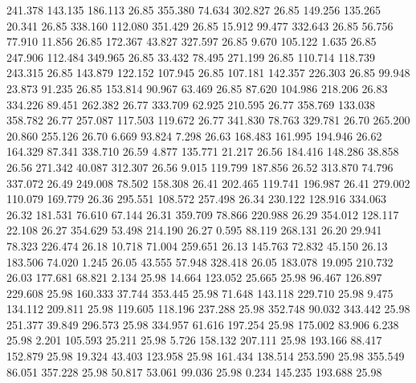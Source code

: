 241.378  143.135  186.113        26.85
 355.380   74.634  302.827        26.85
 149.256  135.265   20.341        26.85
 338.160  112.080  351.429        26.85
  15.912   99.477  332.643        26.85
  56.756   77.910   11.856        26.85
 172.367   43.827  327.597        26.85
   9.670  105.122    1.635        26.85
 247.906  112.484  349.965        26.85
  33.432   78.495  271.199        26.85
 110.714  118.739  243.315        26.85
 143.879  122.152  107.945        26.85
 107.181  142.357  226.303        26.85
  99.948   23.873   91.235        26.85
 153.814   90.967   63.469        26.85
  87.620  104.986  218.206        26.83
 334.226   89.451  262.382        26.77
 333.709   62.925  210.595        26.77
 358.769  133.038  358.782        26.77
 257.087  117.503  119.672        26.77
 341.830   78.763  329.781        26.70
 265.200   20.860  255.126        26.70
   6.669   93.824    7.298        26.63
 168.483  161.995  194.946        26.62
 164.329   87.341  338.710        26.59
   4.877  135.771   21.217        26.56
 184.416  148.286   38.858        26.56
 271.342   40.087  312.307        26.56
   9.015  119.799  187.856        26.52
 313.870   74.796  337.072        26.49
 249.008   78.502  158.308        26.41
 202.465  119.741  196.987        26.41
 279.002  110.079  169.779        26.36
 295.551  108.572  257.498        26.34
 230.122  128.916  334.063        26.32
 181.531   76.610   67.144        26.31
 359.709   78.866  220.988        26.29
 354.012  128.117   22.108        26.27
 354.629   53.498  214.190        26.27
   0.595   88.119  268.131        26.20
  29.941   78.323  226.474        26.18
  10.718   71.004  259.651        26.13
 145.763   72.832   45.150        26.13
 183.506   74.020    1.245        26.05
  43.555   57.948  328.418        26.05
 183.078   19.095  210.732        26.03
 177.681   68.821    2.134        25.98
  14.664  123.052   25.665        25.98
  96.467  126.897  229.608        25.98
 160.333   37.744  353.445        25.98
  71.648  143.118  229.710        25.98
   9.475  134.112  209.811        25.98
 119.605  118.196  237.288        25.98
 352.748   90.032  343.442        25.98
 251.377   39.849  296.573        25.98
 334.957   61.616  197.254        25.98
 175.002   83.906    6.238        25.98
   2.201  105.593   25.211        25.98
   5.726  158.132  207.111        25.98
 193.166   88.417  152.879        25.98
  19.324   43.403  123.958        25.98
 161.434  138.514  253.590        25.98
 355.549   86.051  357.228        25.98
  50.817   53.061   99.036        25.98
   0.234  145.235  193.688        25.98
